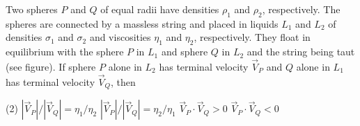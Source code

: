 
\item Two spheres \( P \) and \( Q \) of equal radii have densities \( \rho_1 \) and \( \rho_2 \), respectively. The spheres are connected by a massless string and placed in liquids \( L_1 \) and \( L_2 \) of densities \( \sigma_1 \) and \( \sigma_2 \) and viscosities \( \eta_1 \) and \( \eta_2 \), respectively. They float in equilibrium with the sphere \( P \) in \( L_1 \) and sphere \( Q \) in \( L_2 \) and the string being taut (see figure). If sphere \( P \) alone in \( L_2 \) has terminal velocity \( \vec{V}_P \) and \( Q \) alone in \( L_1 \) has terminal velocity \( \vec{V}_Q \), then
        \begin{tasks}(2)
            \task \( \left| \vec{V}_P \right| / \left| \vec{V}_Q \right| = \eta_1 / \eta_2 \)
            \task \( \left| \vec{V}_P \right| / \left| \vec{V}_Q \right| = \eta_2 / \eta_1 \)
            \task \( \vec{V}_P \cdot \vec{V}_Q > 0 \)
            \task \( \vec{V}_P \cdot \vec{V}_Q < 0 \)
        \end{tasks}
\begin{center}
\end{center}
